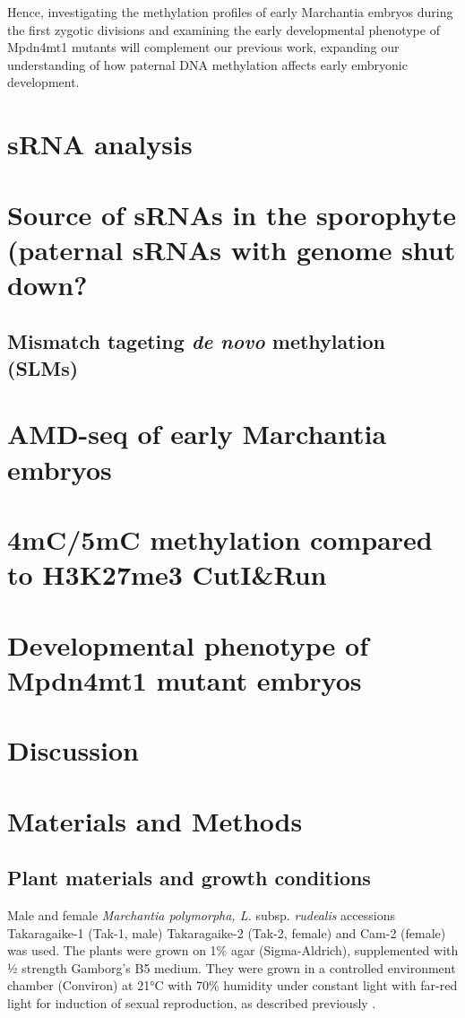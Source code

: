 Hence, investigating the methylation profiles of early Marchantia embryos during the first zygotic divisions and examining the early developmental phenotype of Mpdn4mt1 mutants will complement our previous work, expanding our understanding of how paternal DNA methylation affects early embryonic development.


\section{sRNA analysis}
\section{Source of sRNAs in the sporophyte (paternal sRNAs with genome shut down?}
\subsection{Mismatch tageting \textit{de novo} methylation (SLMs)}

\section{AMD-seq of early Marchantia embryos}

\section{4mC/5mC methylation compared to H3K27me3 CutI\&Run}

\section{Developmental phenotype of Mpdn4mt1 mutant embryos}

\section{Discussion}

\section{Materials and Methods}

\subsection{Plant materials and growth conditions}

Male and female \textit{Marchantia polymorpha, L.} subsp. \textit{rudealis} accessions Takaragaike-1 (Tak-1, male) Takaragaike-2 (Tak-2, female) and Cam-2 (female) was used. The plants were grown on 1\% agar (Sigma-Aldrich), supplemented with ½ strength Gamborg's B5 medium. They were grown in a controlled environment chamber (Conviron) at 21°C with 70\% humidity under constant light with far-red light for induction of sexual reproduction, as described previously \citep{RN212,RN254}.

